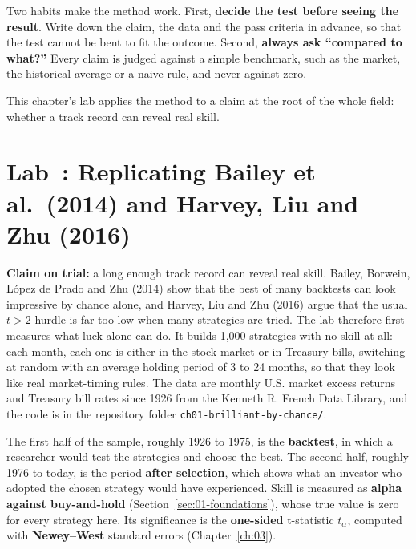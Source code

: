 Two habits make the method work. First, \textbf{decide the test before seeing the result}. Write down the claim, the data and the pass criteria in advance, so that the test cannot be bent to fit the outcome. Second, \textbf{always ask ``compared to what?''} Every claim is judged against a simple benchmark, such as the market, the historical average or a naive rule, and never against zero.

This chapter's lab applies the method to a claim at the root of the whole field: whether a track record can reveal real skill.

\section{Lab~\thechapter: Replicating Bailey et al.\ (2014) and Harvey, Liu and Zhu (2016)}
\label{sec:01-lab}

\textbf{Claim on trial:} a long enough track record can reveal real skill. Bailey, Borwein, L\'opez de Prado and Zhu (2014) show that the best of many backtests can look impressive by chance alone, and Harvey, Liu and Zhu (2016) argue that the usual $t > 2$ hurdle is far too low when many strategies are tried. The lab therefore first measures what luck alone can do. It builds 1,000 strategies with no skill at all: each month, each one is either in the stock market or in Treasury bills, switching at random with an average holding period of 3 to 24 months, so that they look like real market-timing rules. The data are monthly U.S. market excess returns and Treasury bill rates since 1926 from the Kenneth R. French Data Library, and the code is in the repository folder \texttt{ch01-brilliant-by-chance/}.

The first half of the sample, roughly 1926 to 1975, is the \textbf{backtest}, in which a researcher would test the strategies and choose the best. The second half, roughly 1976 to today, is the period \textbf{after selection}, which shows what an investor who adopted the chosen strategy would have experienced. Skill is measured as \textbf{alpha against buy-and-hold} (Section~\ref{sec:01-foundations}), whose true value is zero for every strategy here. Its significance is the \textbf{one-sided} t-statistic $t_\alpha$, computed with \textbf{Newey--West} standard errors (Chapter~\ref{ch:03}).

